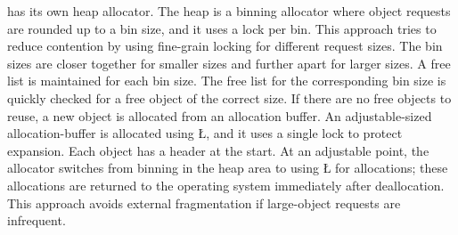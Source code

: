 \documentclass[openright,twoside]{report}
\begin{document}
\uC has its own heap allocator.
The heap is a binning allocator where object requests are rounded up to a bin size, and it uses a lock per bin.
This approach tries to reduce contention by using fine-grain locking for different request sizes.
The bin sizes are closer together for smaller sizes and further apart for larger sizes.
A free list is maintained for each bin size.
The free list for the corresponding bin size is quickly checked for a free object of the correct size.
If there are no free objects to reuse, a new object is allocated from an allocation buffer.
An adjustable-sized allocation-buffer is allocated using \LGinlinetrue\LGbegin\lgrinde\L{}\endlgrinde\LGend{}, and it uses a single lock to protect expansion.
Each object has a header at the start.
At an adjustable point, the allocator switches from binning in the heap area to using \LGinlinetrue\LGbegin\lgrinde\L{}\endlgrinde\LGend{} for allocations;
these allocations are returned to the operating system immediately after deallocation.
This approach avoids external fragmentation if large-object requests are infrequent.
\end{document}
